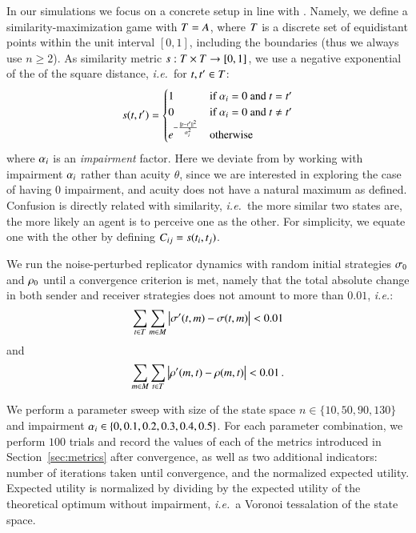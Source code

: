 In our simulations we focus on a concrete setup in line with \cite{Correia2013:The-Bivalent-Tr}.
Namely, we define a similarity-maximization game with $T = A$, where $T$ is a discrete set of equidistant points within the unit interval $[0,1]$, including the boundaries (thus we always use $n \geq 2$).
As similarity metric $s:T \times T \rightarrow [0,1]$, we use a negative exponential of the of the square distance, \emph{i.e.}~for $t,t^\prime \in T$:
\begin{align*}
  s(t,t^\prime) =
    \begin{cases}
    1 & \textrm{if } \alpha_i = 0 \textrm{ and } t = t^\prime \\
    0 & \textrm{if } \alpha_i = 0 \textrm{ and } t \neq t^\prime \\
    e^{-\frac{\lVert t - t^\prime \rVert ^2}{\alpha_i^2}} & \textrm{otherwise} \\
    \end{cases}
\end{align*}
where $\alpha_i$ is an \emph{impairment} factor.
Here we deviate from \cite{Correia2013:The-Bivalent-Tr} by working with impairment $\alpha_i$ rather than acuity $\theta$, since we are interested in exploring the case of having $0$ impairment, and acuity does not have a natural maximum as defined.
Confusion is directly related with similarity, \emph{i.e.}~the more similar two states are, the more likely an agent is to perceive one as the other.
For simplicity, we equate one with the other by defining $C_{ij} = s(t_i,t_j)$.

We run the noise-perturbed replicator dynamics with random initial strategies $\sigma_0$ and $\rho_0$ until a convergence criterion is met, namely that the total absolute change in both sender and receiver strategies does not amount to more than $0.01$, \emph{i.e.}:
\begin{align*}
  \sum_{t \in T} \sum_{m \in M} \left| \sigma^\prime(t,m) - \sigma(t,m) \right| < 0.01
\end{align*}
and
\begin{align*}
  \sum_{m \in M} \sum_{t \in T} \left| \rho^\prime(m,t) - \rho(m,t) \right| < 0.01 \,.
\end{align*}

We perform a parameter sweep with size of the state space $n \in \{10,
50, 90, 130\}$ and impairment $\alpha_i \in \{0, 0.1, 0.2, 0.3,
0.4, 0.5\}$.
For each parameter combination, we perform $100$ trials and record the values of each of the metrics introduced in Section~\ref{sec:metrics} after convergence, as well as two additional indicators: number of iterations taken until convergence, and the normalized expected utility.
Expected utility is normalized by dividing by the expected utility of the theoretical optimum without impairment, \emph{i.e.}~a Voronoi tessalation of the state space. 

